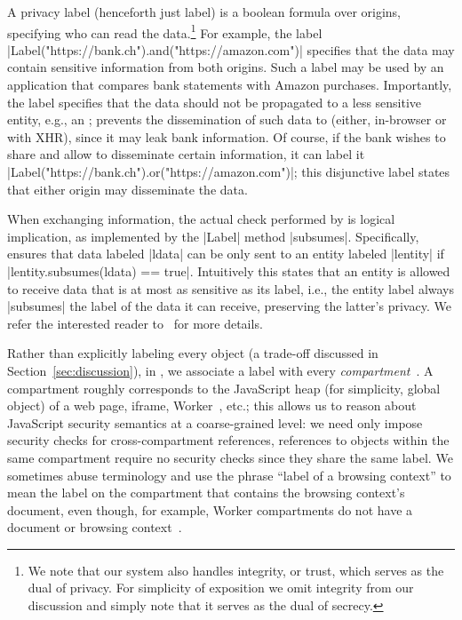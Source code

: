A privacy label (henceforth just label) is a boolean formula over
origins, specifying who can read the data.\footnote{
  We note that our system also handles integrity, or trust, which
  serves as the dual of privacy.
  For simplicity of exposition we omit integrity from our discussion
  and simply note that it serves as the dual of secrecy.

}
%
For example, the label
\js|Label("https://bank.ch").and("https://amazon.com")| specifies that
the data may contain sensitive information from both origins.
%
Such a label may be used by an application that compares bank
statements with Amazon purchases.
%
Importantly, the label specifies that the data should not be
propagated to a less sensitive entity, e.g., an ;
\sys{} prevents the dissemination of such data to 
(either, in-browser or with XHR), since it may leak bank information.
%
Of course, if the bank wishes to share and allow  to
disseminate certain information, it can label it
\js|Label("https://bank.ch").or("https://amazon.com")|;
this disjunctive label states that either origin may disseminate the
data.

When exchanging information, the actual check performed by \sys{} is
logical implication, as implemented by the \js|Label| method
\js|subsumes|.
%
Specifically, \sys{} ensures that data labeled \js|ldata| can be only sent
to an entity labeled \js|lentity| if
\js|lentity.subsumes(ldata) == true|.
%
Intuitively this states that an entity is allowed to receive data that
is at most as sensitive as its label, i.e., the entity label
always \js|subsumes| the label of the data it can receive,
preserving the latter's privacy.
%
We refer the interested reader to~\cite{stefan:2011:dclabels} for more
details.

Rather than explicitly labeling every object (a trade-off discussed in
Section~\ref{sec:discussion}), in \sys, we associate a label with
every \emph{compartment}~\cite{wagner2011compartmental}.
%
A compartment roughly corresponds to the JavaScript heap (for
simplicity, global object) of a web page, iframe, Worker~\cite{workers},
etc.; this allows us to reason about JavaScript security semantics at
a coarse-grained level: we need only impose security checks for
cross-compartment references, references to objects within the same
compartment require no security checks since they share the same
label.
%
We sometimes abuse terminology and use the phrase  ``label of a
browsing context'' to mean the label on the compartment that contains
the browsing context's document, even though, for example, Worker
compartments do not have a document or browsing
context~\cite{workers}.
 
